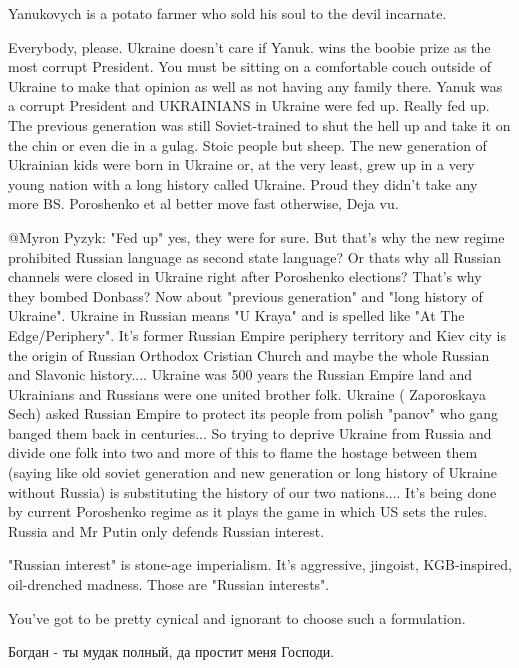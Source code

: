\begin{itemize}
\begin{itemize}
Yanukovych is a potato farmer who sold his soul to the devil incarnate.


Everybody, please. Ukraine doesn't care if Yanuk. wins the boobie prize as the
most corrupt President. You must be sitting on a comfortable couch outside of
Ukraine to make that opinion as well as not having any family there. Yanuk was
a corrupt President and UKRAINIANS in Ukraine were fed up. Really fed up. The
previous generation was still Soviet-trained to shut the hell up and take it on
the chin or even die in a gulag. Stoic people but sheep. The new generation of
Ukrainian kids were born in Ukraine or, at the very least, grew up in a very
young nation with a long history called Ukraine. Proud they didn't take any
more BS. Poroshenko et al better move fast otherwise, Deja vu.


@Myron Pyzyk: "Fed up" yes, they were for sure. But that's why the new regime
prohibited Russian language as second state language? Or thats why all Russian
channels were closed in Ukraine right after Poroshenko elections? That's why
they bombed Donbass? Now about "previous generation" and "long history of
Ukraine". Ukraine in Russian means "U Kraya" and is spelled like "At The
Edge/Periphery". It's former Russian Empire periphery territory and Kiev city
is the origin of Russian Orthodox Cristian Church and maybe the whole Russian
and Slavonic history.... Ukraine was 500 years the Russian Empire land and
Ukrainians and Russians were one united brother folk. Ukraine ( Zaporoskaya
Sech) asked Russian Empire to protect its people from polish "panov" who gang
banged them back in centuries... So trying to deprive Ukraine from Russia and
divide one folk into two and more of this to flame the hostage between them
(saying like old soviet generation and new generation or long history of
Ukraine without Russia) is substituting the history of our two nations.... It's
being done by current Poroshenko regime as it plays the game in which US sets
the rules. Russia and Mr Putin only defends Russian interest.


"Russian interest" is stone-age imperialism. It's aggressive, jingoist,
KGB-inspired, oil-drenched madness. Those are "Russian interests".

You've got to be pretty cynical and ignorant to choose such a formulation.


Богдан - ты мудак полный, да простит меня Господи.


\end{itemize}
\end{itemize}
